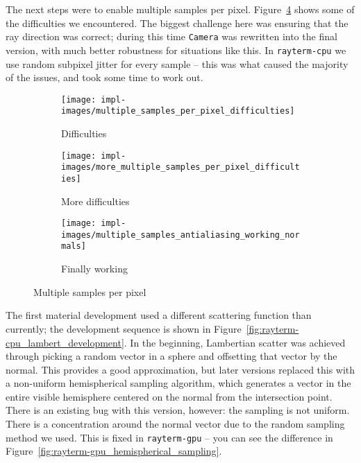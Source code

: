 The next steps were to enable multiple samples per pixel.
Figure~\ref{fig:rayterm-cpu_multisampling} shows some of the difficulties we encountered.
The biggest challenge here was ensuring that the ray direction was correct;
during this time \texttt{Camera} was rewritten into the final version, with much better robustness for situations like this.
In \texttt{rayterm-cpu} we use random subpixel jitter for every sample -- this was what caused the majority of the issues, and took some time to work out.

\vspace{0.3em}
\begin{figure}[htb]
  \centering
  \begin{subfigure}[htb]{0.3\textwidth}
    \texttt{[image: impl-images/multiple\_samples\_per\_pixel\_difficulties]}
    \caption{Difficulties}
    \label{fig:rayterm-cpu_multisample_problems}
  \end{subfigure}
  \begin{subfigure}[htb]{0.3\textwidth}
    \texttt{[image: impl-images/more\_multiple\_samples\_per\_pixel\_difficulties]}
    \caption{More difficulties}
    \label{fig:rayterm-cpu_multisample_more_problems}
  \end{subfigure}
  \begin{subfigure}[htb]{0.3\textwidth}
    \texttt{[image: impl-images/multiple\_samples\_antialiasing\_working\_normals]}
    \caption{Finally working}
    \label{fig:rayterm-cpu_multisample_working}
  \end{subfigure}
  \caption{Multiple samples per pixel}
  \label{fig:rayterm-cpu_multisampling}
\end{figure}

The first material development used a different scattering function than currently; the development sequence is shown in Figure~\ref{fig:rayterm-cpu_lambert_development}.
In the beginning, Lambertian scatter was achieved through picking a random vector in a sphere and offsetting that vector by the normal.
This provides a good approximation, but later versions replaced this with a non-uniform hemispherical sampling algorithm, which generates a vector in the entire visible hemisphere centered on the normal from the intersection point.
There is an existing bug with this version, however: the sampling is not uniform.
There is a concentration around the normal vector due to the random sampling method we used.
This is fixed in \texttt{rayterm-gpu} -- you can see the difference in Figure~\ref{fig:rayterm-gpu_hemispherical_sampling}.

